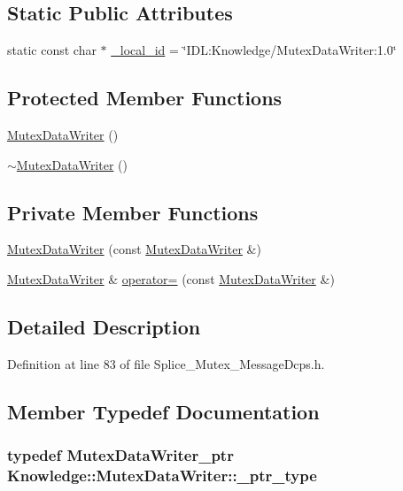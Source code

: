 \subsection*{Static Public Attributes}
\begin{DoxyCompactItemize}
\item 
static const char $\ast$ \hyperlink{classKnowledge_1_1MutexDataWriter_acfa4fbf8d9565507badea82e4542f611}{\_\-local\_\-id} = \char`\"{}IDL:Knowledge/MutexDataWriter:1.0\char`\"{}
\end{DoxyCompactItemize}
\subsection*{Protected Member Functions}
\begin{DoxyCompactItemize}
\item 
\hyperlink{classKnowledge_1_1MutexDataWriter_a73292aa5658e8eeb0761e3fef68040cf}{MutexDataWriter} ()
\item 
\hyperlink{classKnowledge_1_1MutexDataWriter_aa020a736dc3d896167852267e6b86265}{$\sim$MutexDataWriter} ()
\end{DoxyCompactItemize}
\subsection*{Private Member Functions}
\begin{DoxyCompactItemize}
\item 
\hyperlink{classKnowledge_1_1MutexDataWriter_a8ddcc62af8186e141c0d2100ebeeb1f7}{MutexDataWriter} (const \hyperlink{classKnowledge_1_1MutexDataWriter}{MutexDataWriter} \&)
\item 
\hyperlink{classKnowledge_1_1MutexDataWriter}{MutexDataWriter} \& \hyperlink{classKnowledge_1_1MutexDataWriter_a2fbc6318934fe13697a0e493eefe8bb2}{operator=} (const \hyperlink{classKnowledge_1_1MutexDataWriter}{MutexDataWriter} \&)
\end{DoxyCompactItemize}


\subsection{Detailed Description}


Definition at line 83 of file Splice\_\-Mutex\_\-MessageDcps.h.



\subsection{Member Typedef Documentation}
\hypertarget{classKnowledge_1_1MutexDataWriter_a3770228b7ac3f52d1d49afe8d016bead}{
\subsubsection[{\_\-ptr\_\-type}]{\setlength{\rightskip}{0pt plus 5cm}typedef {\bf MutexDataWriter\_\-ptr} {\bf Knowledge::MutexDataWriter::\_\-ptr\_\-type}}}
\label{d7/dc9/classKnowledge_1_1MutexDataWriter_a3770228b7ac3f52d1d49afe8d016bead}


